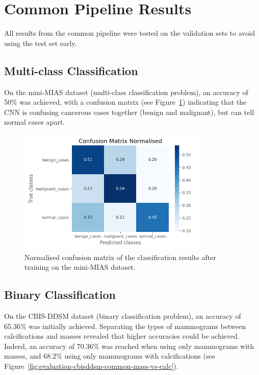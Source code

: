 \section{Common Pipeline Results}

All results from the common pipeline were tested on the validation sets to avoid using the test set early.

\subsection{Multi-class Classification}

On the mini-MIAS dataset (multi-class classification problem), an accuracy of 50\% was achieved, with a confusion matrix (see Figure~\ref{fig:evaluation-common-CM-norm_basic-model_mini-MIAS-dataset}) indicating that the CNN is confusing cancerous cases together (benign and malignant), but can tell normal cases apart.

\begin{figure}[ht]
\centerline{\includegraphics[width=0.8\textwidth]{figures/evaluation/common/CM-norm_basic-model_mini-MIAS-dataset.png}}
\caption{\label{fig:evaluation-common-CM-norm_basic-model_mini-MIAS-dataset}Normalised confusion matrix of the classification results after training on the mini-MIAS dataset.}
\end{figure}

\subsection{Binary Classification}

On the CBIS-DDSM dataset (binary classification problem), an accuracy of 65.36\% was initially achieved. Separating the types of mammograms between calcifications and masses revealed that higher accuracies could be achieved. Indeed, an accuracy of 70.36\% was reached when using only mammograms with masses, and 68.2\%  using only mammograms with calcifications (see Figure~\ref{fig:evaluation-cbisddsm-common-mass-vs-calc}).

